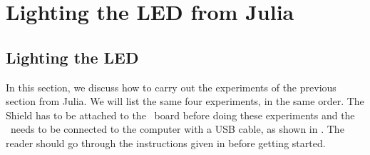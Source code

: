 \section{Lighting the LED from Julia}
\subsection{Lighting the LED}
\label{sec:light-julia}
In this section, we discuss how to carry out the experiments of the
previous section from Julia.  We will list the same four experiments,
in the same order.  The Shield has to be attached to the \arduino\ board
before doing these experiments and the \arduino\ needs to be connected to the computer 
with a USB cable, as shown in .
The reader should go through the instructions given in  before getting started.

